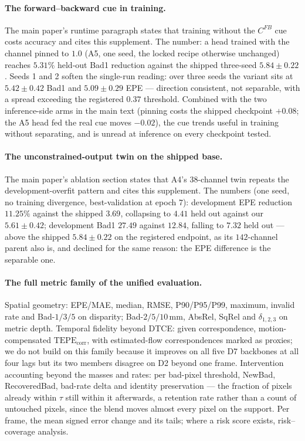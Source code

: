 \documentclass[letterpaper,10pt,conference]{ieeeconf}
\begin{document}
\paragraph{The forward--backward cue in training.}
The main paper's runtime paragraph states that training without the
$C^{FB}$ cue costs accuracy and cites this supplement. The number: a head
trained with the channel pinned to $1.0$ (A5, one seed, the locked recipe
otherwise unchanged) reaches $5.31\%$ held-out Bad1 reduction against the
shipped three-seed $5.84\pm0.22$. Seeds 1 and 2 soften the single-run
reading: over three seeds the variant sits at $5.42\pm0.42$ Bad1 and
$5.09\pm0.29$ EPE --- direction consistent, not separable, with a spread
exceeding the registered $0.37$ threshold.
Combined with the two inference-side arms in the main text (pinning costs
the shipped checkpoint $+0.08$; the A5 head fed the real cue moves $-0.02$),
the cue trends useful in training without separating, and is unread at
inference on every checkpoint tested.

\paragraph{The unconstrained-output twin on the shipped base.}
The main paper's ablation section states that A4's $38$-channel twin repeats
the development-overfit pattern and cites this supplement. The numbers (one
seed, no training divergence, best-validation at epoch $7$): development EPE
reduction $11.25\%$ against the shipped $3.69$, collapsing to $4.41$ held out
against our $5.61\pm0.42$; development Bad1 $27.49$ against $12.84$,
falling to $7.32$ held out --- above the shipped $5.84\pm0.22$ on the
registered endpoint, as its $142$-channel parent also is, and declined for
the same reason: the EPE difference is the separable one.

\paragraph{The full metric family of the unified evaluation.}
Spatial geometry: EPE/MAE, median, RMSE, P90/P95/P99, maximum, invalid rate
and Bad-$1/3/5$ on disparity; Bad-$2/5/10$\,mm, AbsRel, SqRel and
$\delta_{1,2,3}$ on metric depth. Temporal fidelity beyond DTCE: given
correspondence, motion-compensated $\mathrm{TEPE}_{\mathrm{corr}}$, with
estimated-flow correspondences marked as proxies; we do not build on this
family because it improves on all five D7 backbones at all four lags but its
two members disagree on D2 beyond one frame. Intervention accounting beyond
the masses and rates: per bad-pixel threshold, NewBad, RecoveredBad, bad-rate
delta and identity preservation --- the fraction of pixels already within
$\tau$ still within it afterwards, a retention rate rather than a count of
untouched pixels, since the blend moves almost every pixel on the support.
Per frame, the mean signed error change and its tails; where a risk score
exists, risk--coverage analysis.
\end{document}
